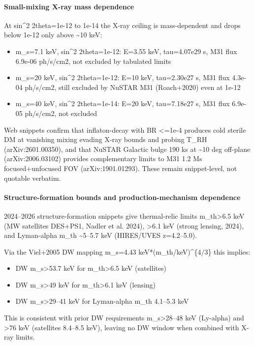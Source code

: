 \documentclass[11pt,a4paper]{article}
\begin{document}
\paragraph{Small-mixing X-ray mass dependence}
At sin\textasciicircum{}2 2theta=1e-12 to 1e-14 the X-ray ceiling is mass-dependent and drops below 1e-12 only above \textasciitilde{}10 keV:

\begin{itemize}
  \item m\_s=7.1 keV, sin\textasciicircum{}2 2theta=1e-12: E=3.55 keV, tau=4.07e29 s, M31 flux 6.9e-06 ph/s/cm2, not excluded by tabulated limits
  \item m\_s=20 keV, sin\textasciicircum{}2 2theta=1e-12: E=10 keV, tau=2.30e27 s, M31 flux 4.3e-04 ph/s/cm2, still excluded by NuSTAR M31 (Roach+2020) even at 1e-12
  \item m\_s=40 keV, sin\textasciicircum{}2 2theta=1e-14: E=20 keV, tau=7.18e27 s, M31 flux 6.9e-05 ph/s/cm2, not excluded
\end{itemize}
Web snippets confirm that inflaton-decay with BR \textless{}=1e-4 produces cold sterile DM at vanishing mixing evading X-ray bounds and probing T\_RH (arXiv:2601.00350), and that NuSTAR Galactic bulge 190 ks at \textasciitilde{}10 deg off-plane (arXiv:2006.03102) provides complementary limits to M31 1.2 Ms focused+unfocused FOV (arXiv:1901.01293). These remain snippet-level, not quotable verbatim.

\paragraph{Structure-formation bounds and production-mechanism dependence}
2024--2026 structure-formation snippets give thermal-relic limits m\_th\textgreater{}6.5 keV (MW satellites DES+PS1, Nadler et al. 2024), \textgreater{}6.1 keV (strong lensing, 2024), and Lyman-alpha m\_th \textasciitilde{}5--5.7 keV (HIRES/UVES z=4.2--5.0).

Via the Viel+2005 DW mapping m\_s=4.43 keV*(m\_th/keV)\textasciicircum{}\{4/3\} this implies:

\begin{itemize}
  \item DW m\_s\textgreater{}53.7 keV for m\_th\textgreater{}6.5 keV (satellites)
  \item DW m\_s\textgreater{}49 keV for m\_th\textgreater{}6.1 keV (lensing)
  \item DW m\_s\textgreater{}29--41 keV for Lyman-alpha m\_th 4.1--5.3 keV
\end{itemize}
This is consistent with prior DW requirements m\_s\textgreater{}28--48 keV (Ly-alpha) and \textgreater{}76 keV (satellites 8.4--8.5 keV), leaving no DW window when combined with X-ray limits.
\end{document}
